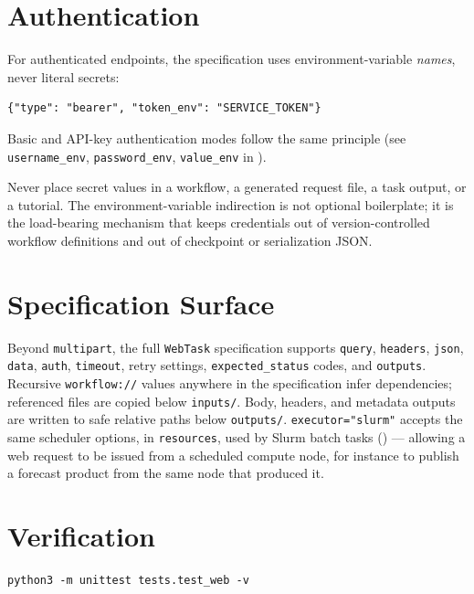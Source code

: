 \section{Authentication}

For authenticated endpoints, the specification uses environment-variable
\emph{names}, never literal secrets:

\begin{lstlisting}
{"type": "bearer", "token_env": "SERVICE_TOKEN"}
\end{lstlisting}

Basic and API-key authentication modes follow the same principle (see
\texttt{username\_env}, \texttt{password\_env}, \texttt{value\_env} in
).

\begin{cautionbox}
Never place secret values in a workflow, a generated request file, a task
output, or a tutorial. The environment-variable indirection is not optional
boilerplate; it is the load-bearing mechanism that keeps credentials out of
version-controlled workflow definitions and out of checkpoint or
serialization JSON.
\end{cautionbox}

\section{Specification Surface}

Beyond \texttt{multipart}, the full \texttt{WebTask} specification supports
\texttt{query}, \texttt{headers}, \texttt{json}, \texttt{data}, \texttt{auth},
\texttt{timeout}, retry settings, \texttt{expected\_status} codes, and
\texttt{outputs}. Recursive \texttt{workflow://} values anywhere in the
specification infer dependencies; referenced files are copied below
\texttt{inputs/}. Body, headers, and metadata outputs are written to safe
relative paths below \texttt{outputs/}. \texttt{executor="slurm"} accepts
the same scheduler options, in \texttt{resources}, used by Slurm batch tasks
() --- allowing a web request to be issued from a
scheduled compute node, for instance to publish a forecast product from the
same node that produced it.

\section{Verification}

\begin{lstlisting}[style=bash]
python3 -m unittest tests.test_web -v
\end{lstlisting}

